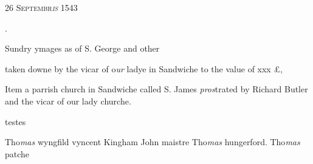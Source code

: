 \documentclass[12pt, a4paper]{book}
\begin{document}
            
            
               
				\begin{center} \begin{large} {\scshape 
                  26 Septembr\textit{is} 1543
               } \end{large} \end{center}
			
.
 
 	
				\marginpar[\vspace{0.5cm}{\textcolor{Gray}{Saint Mary of Sandwiche}}]{}
			
 	
				\marginpar[\vspace{0.5cm}{\textcolor{Gray}{the vicar of s. mary}}]{}
			
 	
		\ifthenelse{\isodd{\thepage}}
		{\reversemarginpar}
		{\normalmarginpar}
		Sundry ymages as of S. George and other
 	
 		taken downe by the vicar of o\textit{ur }ladye in Sandwiche
 to the value of xxx £,

	
			
	
		\ifthenelse{\isodd{\thepage}}
		{\reversemarginpar}
		{\normalmarginpar}
		Item a parrish church in Sandwiche called S. James
 \textit{pros}trated by Richard Butler and the vicar of our
 lady churche.


	
		\ifthenelse{\isodd{\thepage}}
		{\reversemarginpar}
		{\normalmarginpar}
		testes
	
		\ifthenelse{\isodd{\thepage}}
		{\reversemarginpar}
		{\normalmarginpar}
		Tho\textit{mas} wyngfild vyncent Kingham John maistre
		Tho\textit{mas }hungerford. Tho\textit{mas} patche



            
\dotfill
						\newpage {} \subsection*{}  \subsection*{}  \subsection*{}
\end{document}
